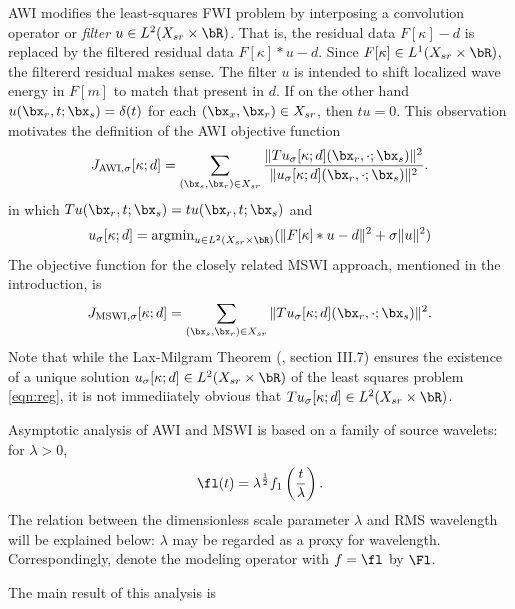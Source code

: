 AWI modifies the least-squares FWI problem by interposing a convolution operator or
{\em filter} $u \in L^2(X_{sr} \times \bR)$. That is, the residual
data $F[\kappa]-d$ is replaced by the filtered residual data $F[\kappa]*u-d$.
Since $F[\kappa] \in L^1(X_{sr}\times \bR)$, the filtererd residual
makes sense.
The filter $u$ is intended to shift localized wave energy in $F[m]$ to
match that present in $d$. If on the other hand $u(\bx_r,t;\bx_s) =
\delta(t)$ for each $(\bx_x,\bx_r) \in X_{sr}$, then $tu = 0$. This
observation motivates the definition of the AWI objective function
\begin{equation}
  \label{eqn:awidefmain}
  J_{\rm AWI,\sigma}[\kappa;d] = \sum_{(\bx_s,\bx_r) \in X_{sr}}
  \frac{\|Tu_{\sigma}[\kappa;d](\bx_r,\cdot;\bx_s)\|^2}{\|u_{\sigma}[\kappa;d](\bx_r,\cdot;\bx_s)\|^2}.
\end{equation}
in which $Tu(\bx_r,t;\bx_s) = tu(\bx_r,t;\bx_s)$ and
\begin{equation}
  \label{eqn:reg}
  u_{\sigma}[\kappa;d] = \mbox{argmin}_{u \in L^2(X_{sr} \times \bR)} (\|F[\kappa]*u-d\|^2 + \sigma\|u\|^2)
\end{equation}
The objective function for the closely related MSWI approach,
mentioned in the introduction, is  
\begin{equation}
  \label{eqn:mswidefmain}
  J_{\rm MSWI,\sigma}[\kappa;d] = \sum_{(\bx_s,\bx_r) \in X_{sr}}
  \|Tu_{\sigma}[\kappa;d](\bx_r,\cdot;\bx_s)\|^2.
\end{equation}
Note that while the Lax-Milgram Theorem (\cite{Yosida}, section
III.7) ensures the existence of a unique solution
$u_{\sigma}[\kappa;d] \in L^2(X_{sr}\times \bR)$ of the least squares
problem \ref{eqn:reg},
it is not immediiately obvious that $Tu_{\sigma}[\kappa;d] \in L^2(X_{sr}\times \bR)$.

Asymptotic analysis of AWI and MSWI is based on a family of source
wavelets: for $\lambda > 0$,
\begin{equation}
  \fl(t)= \lambda^{\frac{1}{2}}f_1\left(\frac{t}{\lambda}\right).
\end{equation}
The relation between the dimensionless scale parameter $\lambda$ and
RMS wavelength will be explained below: $\lambda$ may be regarded as a
proxy for wavelength. Correspondingly, denote the
modeling operator with $f=\fl$ by $\Fl$.

The main result of this analysis is

